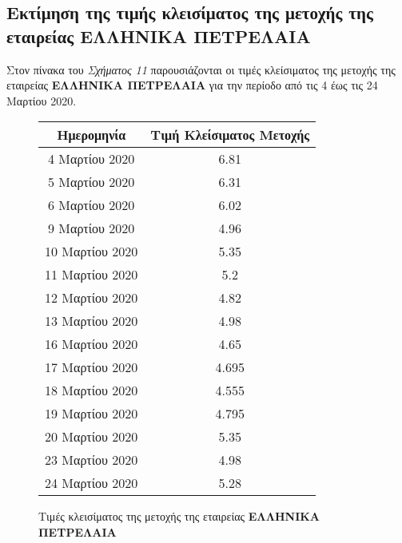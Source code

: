 \documentclass[Second Project.tex]{subfiles}
\begin{document}
\subsection{ Εκτίμηση της τιμής κλεισίματος της μετοχής της εταιρείας \textbf{ΕΛΛΗΝΙΚΑ ΠΕΤΡΕΛΑΙΑ} }
Στον πίνακα του \textit{Σχήματος 11} παρουσιάζονται οι τιμές κλείσιματος της μετοχής της εταιρείας
\textbf{ΕΛΛΗΝΙΚΑ ΠΕΤΡΕΛΑΙΑ} για την περίοδο από τις 4 έως τις 24 Μαρτίου 2020.
\begin{figure}[h!]
    \centering
    \captionsetup{justification=centering}
    \begin{center}
        \begin{tabular}{ |c|c| } 
        \hline
        Ημερομηνία & Τιμή Κλείσιματος Μετοχής \\ \hline
        4 Μαρτίου 2020 & 6.81 \\ \hline
        5 Μαρτίου 2020 & 6.31 \\ \hline
        6 Μαρτίου 2020 & 6.02 \\  \hline
        9 Μαρτίου 2020 & 4.96 \\ \hline
        10 Μαρτίου 2020 & 5.35 \\  \hline
        11 Μαρτίου 2020 & 5.2 \\ \hline
        12 Μαρτίου 2020 & 4.82 \\ \hline
        13 Μαρτίου 2020 & 4.98 \\ \hline
        16 Μαρτίου 2020 & 4.65 \\ \hline
        17 Μαρτίου 2020 & 4.695 \\ \hline
        18 Μαρτίου 2020 & 4.555 \\ \hline
        19 Μαρτίου 2020 & 4.795 \\ \hline
        20 Μαρτίου 2020 & 5.35 \\ \hline
        23 Μαρτίου 2020 & 4.98 \\ \hline
        24 Μαρτίου 2020 & 5.28 \\ \hline
        \hline
        \end{tabular}
        \caption{Τιμές κλεισίματος της μετοχής της εταιρείας \textbf{ΕΛΛΗΝΙΚΑ ΠΕΤΡΕΛΑΙΑ}}
    \end{center}
\end{figure}
\end{document}
